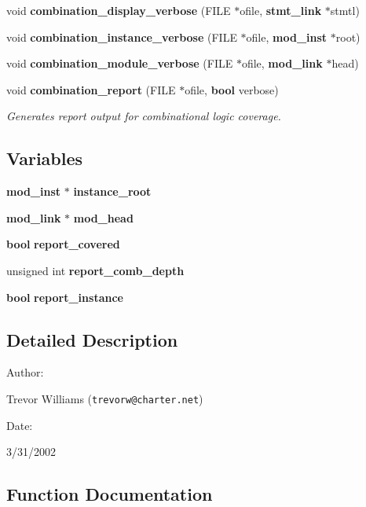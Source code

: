 \begin{CompactItemize}
void {\bf combination\_\-display\_\-verbose} (FILE $\ast$ofile, {\bf stmt\_\-link} $\ast$stmtl)
\item 
void {\bf combination\_\-instance\_\-verbose} (FILE $\ast$ofile, {\bf mod\_\-inst} $\ast$root)
\item 
void {\bf combination\_\-module\_\-verbose} (FILE $\ast$ofile, {\bf mod\_\-link} $\ast$head)
\item 
void {\bf combination\_\-report} (FILE $\ast$ofile, {\bf bool} verbose)
\begin{CompactList}\small\item\em Generates report output for combinational logic coverage.\item\end{CompactList}\end{CompactItemize}
\subsection*{Variables}
\begin{CompactItemize}
\item 
{\bf mod\_\-inst} $\ast$ {\bf instance\_\-root}
\item 
{\bf mod\_\-link} $\ast$ {\bf mod\_\-head}
\item 
{\bf bool} {\bf report\_\-covered}
\item 
unsigned int {\bf report\_\-comb\_\-depth}
\item 
{\bf bool} {\bf report\_\-instance}
\end{CompactItemize}


\subsection{Detailed Description}


\begin{Desc}
\item[Author: ]\par
Trevor Williams ({\tt trevorw@charter.net}) \end{Desc}
\begin{Desc}
\item[Date: ]\par
3/31/2002\end{Desc}


\subsection{Function Documentation}

